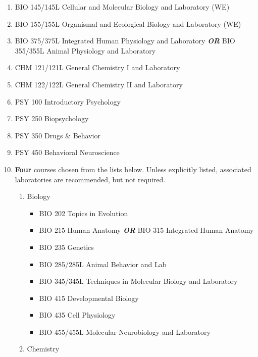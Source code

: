 \documentclass[
  letterpaper,
]{scrbook}
\providecommand{\tightlist}{%
  \setlength{\itemsep}{0pt}\setlength{\parskip}{0pt}}
\begin{document}
\begin{enumerate}
\def\labelenumi{\arabic{enumi}.}
\tightlist
\item
  BIO 145/145L Cellular and Molecular Biology and Laboratory (WE)\\
\item
  BIO 155/155L Organismal and Ecological Biology and Laboratory (WE)\\
\item
  BIO 375/375L Integrated Human Physiology and Laboratory
  \textbf{\emph{OR}} BIO 355/355L Animal Physiology and Laboratory\\
\item
  CHM 121/121L General Chemistry I and Laboratory\\
\item
  CHM 122/122L General Chemistry II and Laboratory\\
\item
  PSY 100 Introductory Psychology\\
\item
  PSY 250 Biopsychology\\
\item
  PSY 350 Drugs \& Behavior\\
\item
  PSY 450 Behavioral Neuroscience\\
\item
  \textbf{Four} courses chosen from the lists below. Unless explicitly
  listed, associated laboratories are recommended, but not required.

  \begin{enumerate}
  \def\labelenumii{\alph{enumii}.}
  \tightlist
  \item
    Biology

    \begin{itemize}
    \tightlist
    \item
      BIO 202 Topics in Evolution\\
    \item
      BIO 215 Human Anatomy \textbf{\emph{OR}} BIO 315 Integrated Human
      Anatomy\\
    \item
      BIO 235 Genetics\\
    \item
      BIO 285/285L Animal Behavior and Lab\\
    \item
      BIO 345/345L Techniques in Molecular Biology and Laboratory\\
    \item
      BIO 415 Developmental Biology\\
    \item
      BIO 435 Cell Physiology\\
    \item
      BIO 455/455L Molecular Neurobiology and Laboratory\\
    \end{itemize}
  \item
    Chemistry


\end{enumerate}
\end{enumerate}
\end{document}
